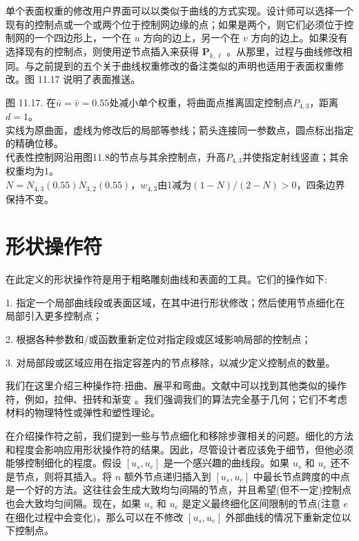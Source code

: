 \documentclass[../main.tex]{subfiles}
\begin{document}
单个表面权重的修改用户界面可以以类似于曲线的方式实现。设计师可以选择一个现有的控制点或一个或两个位于控制网边缘的点；如果是两个，则它们必须位于控制网的一个四边形上，一个在 \(u\) 方向的边上，另一个在 \(v\) 方向的边上。如果没有选择现有的控制点，则使用逆节点插入来获得 \({\mathbf{P}}_{k,\ell }\) 。从那里，过程与曲线修改相同。与之前提到的五个关于曲线权重修改的备注类似的声明也适用于表面权重修改。图 11.17 说明了表面推送。

\begin{center}
\begin{minipage}{26cm}
\centering
{}
\par\smallskip
图 11.17. 在$\bar u=\bar v=0.55$处减小单个权重，将曲面点推离固定控制点$P_{4,3}$，距离$d=1$。\\
实线为原曲面，虚线为修改后的局部等参线；箭头连接同一参数点，圆点标出指定的精确位移。\\
代表性控制网沿用图11.8的节点与其余控制点，升高$P_{4,3}$并使指定射线竖直；其余权重均为1。\\
$N=N_{4,3}(0.55)N_{3,2}(0.55)$，$w_{4,3}$由1减为$(1-N)/(2-N)>0$，四条边界保持不变。
\end{minipage}
\end{center}


\section{形状操作符}
在此定义的形状操作符是用于粗略雕刻曲线和表面的工具。它们的操作如下:

1. 指定一个局部曲线段或表面区域，在其中进行形状修改；然后使用节点细化在局部引入更多控制点；

2. 根据各种参数和/或函数重新定位对指定段或区域影响局部的控制点；

3. 对局部段或区域应用在指定容差内的节点移除，以减少定义控制点的数量。

我们在这里介绍三种操作符:扭曲、展平和弯曲。文献中可以找到其他类似的操作符，例如，拉伸、扭转和渐变 \cite{Barr83,Cobb84}。我们强调我们的算法完全基于几何；它们不考虑材料的物理特性或弹性和塑性理论。

在介绍操作符之前，我们提到一些与节点细化和移除步骤相关的问题。细化的方法和程度会影响应用形状操作符的结果。因此，尽管设计者应该免于细节，但他必须能够控制细化的程度。假设 \(\left\lbrack  {{u}_{s},{u}_{e}}\right\rbrack\) 是一个感兴趣的曲线段。如果 \({u}_{s}\) 和 \({u}_{e}\) 还不是节点，则将其插入。将 \(n\) 额外节点递归插入到 \(\left\lbrack  {{u}_{s},{u}_{e}}\right\rbrack\) 中最长节点跨度的中点是一个好的方法。这往往会生成大致均匀间隔的节点，并且希望(但不一定)控制点也会大致均匀间隔。现在，如果 \({u}_{s}\) 和 \({u}_{e}\) 是定义最终细化区间限制的节点(注意 \(e\) 在细化过程中会变化)，那么可以在不修改 \(\left\lbrack  {{u}_{s},{u}_{e}}\right\rbrack\) 外部曲线的情况下重新定位以下控制点。
\end{document}
